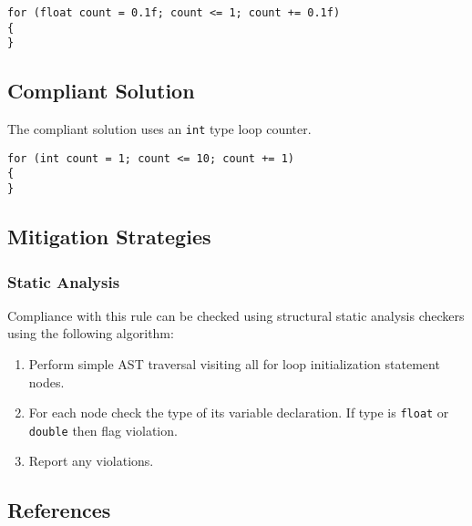 \begin{verbatim}
for (float count = 0.1f; count <= 1; count += 0.1f)
{
}
\end{verbatim}

\subsection{Compliant Solution}
The compliant solution uses an {\tt int} type loop counter.

\begin{verbatim}
for (int count = 1; count <= 10; count += 1) 
{
}
\end{verbatim}

\subsection{Mitigation Strategies}
\subsubsection{Static Analysis} 

Compliance with this rule can be checked using structural static analysis checkers using the following algorithm:

\begin{enumerate}
\item Perform simple AST traversal visiting all for loop initialization statement nodes.
\item For each node check the type of its variable declaration. If type is {\tt float} or {\tt double} then flag violation.
\item Report any violations. 
\end{enumerate}

\subsection{References}

